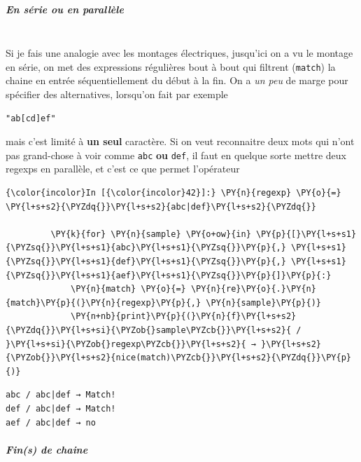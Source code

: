     \hypertarget{en-suxe9rie-ou-en-paralluxe8le}{%
\subparagraph{En série ou en
parallèle\\\\}\label{en-suxe9rie-ou-en-paralluxe8le}}

    Si je fais une analogie avec les montages électriques, jusqu'ici on a vu
le montage en série, on met des expressions régulières bout à bout qui
filtrent (\texttt{match}) la chaine en entrée séquentiellement du début
à la fin. On a \emph{un peu} de marge pour spécifier des alternatives,
lorsqu'on fait par exemple

\begin{verbatim}
"ab[cd]ef"
\end{verbatim}

mais c'est limité à \textbf{un seul} caractère. Si on veut reconnaitre
deux mots qui n'ont pas grand-chose à voir comme \texttt{abc}
\textbf{ou} \texttt{def}, il faut en quelque sorte mettre deux regexps
en parallèle, et c'est ce que permet l'opérateur \texttt{\textbar{}}

    \begin{Verbatim}[commandchars=\\\{\}]
{\color{incolor}In [{\color{incolor}42}]:} \PY{n}{regexp} \PY{o}{=} \PY{l+s+s2}{\PYZdq{}}\PY{l+s+s2}{abc|def}\PY{l+s+s2}{\PYZdq{}}
         
         \PY{k}{for} \PY{n}{sample} \PY{o+ow}{in} \PY{p}{[}\PY{l+s+s1}{\PYZsq{}}\PY{l+s+s1}{abc}\PY{l+s+s1}{\PYZsq{}}\PY{p}{,} \PY{l+s+s1}{\PYZsq{}}\PY{l+s+s1}{def}\PY{l+s+s1}{\PYZsq{}}\PY{p}{,} \PY{l+s+s1}{\PYZsq{}}\PY{l+s+s1}{aef}\PY{l+s+s1}{\PYZsq{}}\PY{p}{]}\PY{p}{:}
             \PY{n}{match} \PY{o}{=} \PY{n}{re}\PY{o}{.}\PY{n}{match}\PY{p}{(}\PY{n}{regexp}\PY{p}{,} \PY{n}{sample}\PY{p}{)}
             \PY{n+nb}{print}\PY{p}{(}\PY{n}{f}\PY{l+s+s2}{\PYZdq{}}\PY{l+s+si}{\PYZob{}sample\PYZcb{}}\PY{l+s+s2}{ / }\PY{l+s+si}{\PYZob{}regexp\PYZcb{}}\PY{l+s+s2}{ → }\PY{l+s+s2}{\PYZob{}}\PY{l+s+s2}{nice(match)\PYZcb{}}\PY{l+s+s2}{\PYZdq{}}\PY{p}{)}
\end{Verbatim}


    \begin{Verbatim}[commandchars=\\\{\}]
abc / abc|def → Match!
def / abc|def → Match!
aef / abc|def → no

    \end{Verbatim}

    \hypertarget{fins-de-chaine}{%
\subparagraph{Fin(s) de chaine\\\\}\label{fins-de-chaine}}

